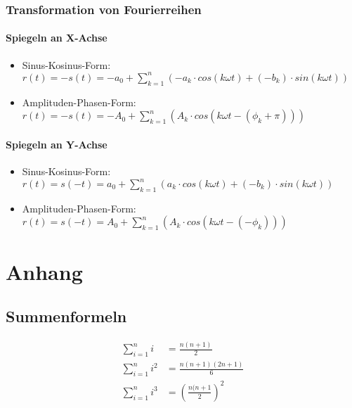 \subsubsection{Transformation von Fourierreihen}
\paragraph{Spiegeln an X-Achse}
\begin{itemize}
  \item Sinus-Kosinus-Form: $r(t) = -s(t) = -a_0 + \sum_{k=1}^{n} ( -a_k \cdot
    cos(k \omega t) + (-b_k) \cdot sin(k \omega t))$
  \item Amplituden-Phasen-Form: $r(t) = -s(t) = -A_0 + \sum_{k=1}^{n} (A_k \cdot cos(k
  \omega t  - (\phi_k + \pi)))$
\end{itemize}
\paragraph{Spiegeln an Y-Achse}
\begin{itemize}
  \item Sinus-Kosinus-Form: $r(t) = s(-t) = a_0 + \sum_{k=1}^{n} ( a_k \cdot
    cos(k \omega t) + (-b_k) \cdot sin(k \omega t))$
  \item Amplituden-Phasen-Form: $r(t) = s(-t) =  A_0 + \sum_{k=1}^{n} (A_k \cdot cos(k
  \omega t  - (-\phi_k)))$
\end{itemize}


\section{Anhang}
\subsection{Summenformeln}
\[ \begin{aligned}
 \sum_{i=1}^{n}i     & = \frac{n(n+1)}{2} \\
 \sum_{i=1}^{n}i^2   & = \frac{n(n+1)(2n+1)}{6} \\
 \sum_{i=1}^{n}i^3   & = \left(\frac{n(n+1}{2}\right)^2 \\
\end{aligned} \]
